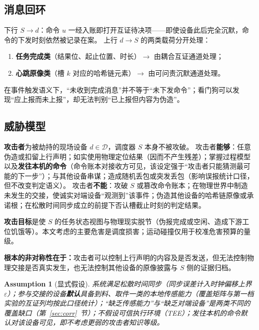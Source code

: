 \documentclass[manuscript,screen,review]{acmart}
\newtheorem{assumption}{Assumption}
\begin{document}
\subsection{消息回环}
\label{sec:msg}

下行 $S\!\to\!d$：命令 $u$ 一经入账即打开互证待决项——即使设备此后完全沉默，命令的下发时刻依然被记录在案。
上行 $d\!\to\!S$ 的两类载荷分开处理：
\begin{enumerate}[leftmargin=*,itemsep=1pt]
  \item \textbf{任务完成类}（结果位、起止位置、时长）$\to$ 由耦合互证通道处理；
  \item \textbf{心跳原像类}（槽 $k$ 对应的哈希链元素）$\to$ 由可问责沉默通道处理。
\end{enumerate}
在事件触发语义下，``未收到完成消息''并不等于``未下发命令''；看门狗可以发现``应上报而未上报''，却无法判别``已上报但内容为伪造''。

\subsection{威胁模型}
\label{sec:threat}

\textbf{攻击者}为被劫持的现场设备 $d\in\mathcal{D}$，调度器 $S$ 本身不被攻破。
攻击者\textbf{能够}：任意伪造或扣留上行声明；如实使用物理定位结果（因而不产生残差）；掌握过程模型以及\textbf{发往本机的命令}（命令账本对接收方可见，该设定强于``攻击者只能猜测最可能的下一步''）；与其他设备串谋；造成随机丢包或突发丢包（影响误报统计口径，但不改变判定语义）。
攻击者\textbf{不能}：攻破 $S$ 或篡改命令账本；在物理世界中制造未发生的交接，使诚实对端设备``观测到''该事件；伪造其他设备的哈希链原像或承诺根；在松散时间同步成立的前提下否认槽截止时刻的判定结果。

\textbf{攻击目标}是使 $S$ 的任务状态视图与物理现实脱节（伪报完成或空闲、造成下游工位饥饿等）。本文考虑的主要危害是调度损害；运动碰撞仅用于校准危害预算的量级。

\textbf{根本的非对称性在于：}攻击者可以控制上行声明的内容及是否发送，但无法控制物理交接是否真实发生，也无法控制其他设备的原像披露与 $S$ 侧的证据归档。

\begin{assumption}[显式假设]
系统满足松散时间同步（同步误差计入时钟偏移上界 $\varepsilon$）；参与交接的设备\textbf{默认}具备到料、取件一类的本地传感能力（覆盖矩阵与第一档实验的互证列均按此口径统计）；``缺乏传感能力''与``缺乏对端设备''是两类不同的覆盖缺口（第~\ref{sec:corr}~节）；不假设可信执行环境（TEE）；发往本机的命令默认对该设备可见，即不考虑更弱的攻击者知识等级。
\end{assumption}
\end{document}
